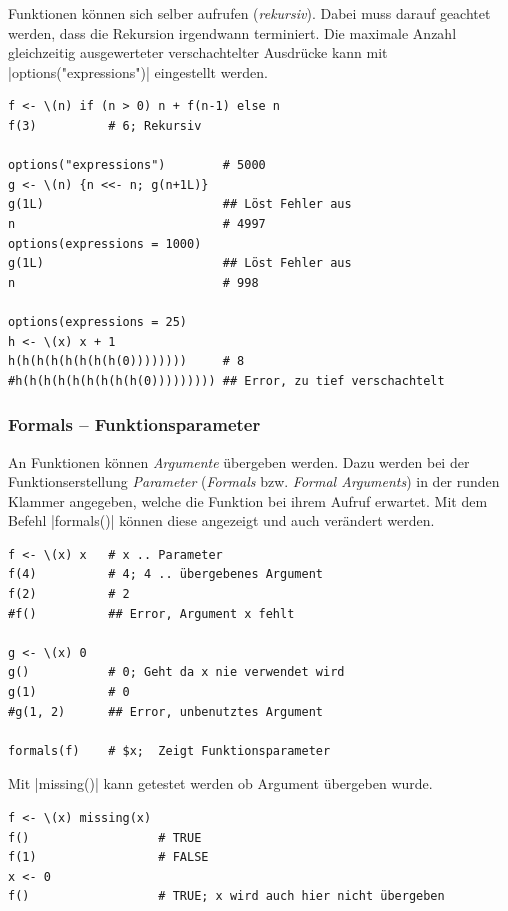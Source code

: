 \documentclass[10pt,twocolumn]{scrartcl}
\renewcommand{\lstinline}{\mycoloredinline}
\begin{document}
Funktionen können sich selber aufrufen (\emph{rekursiv}). Dabei muss darauf geachtet werden, dass die Rekursion irgendwann terminiert. Die maximale Anzahl gleichzeitig ausgewerteter verschachtelter Ausdrücke kann mit \lstinline|options("expressions")| eingestellt werden.

\begin{lstlisting}
f <- \(n) if (n > 0) n + f(n-1) else n
f(3)          # 6; Rekursiv

options("expressions")        # 5000
g <- \(n) {n <<- n; g(n+1L)}
g(1L)                         ## Löst Fehler aus
n                             # 4997
options(expressions = 1000)
g(1L)                         ## Löst Fehler aus
n                             # 998

options(expressions = 25)
h <- \(x) x + 1
h(h(h(h(h(h(h(h(0))))))))     # 8
#h(h(h(h(h(h(h(h(h(0))))))))) ## Error, zu tief verschachtelt
\end{lstlisting}

\subsubsection{Formals -- Funktionsparameter}

An Funktionen können \emph{Argumente} übergeben werden. Dazu werden bei der Funktionserstellung \emph{Parameter} (\emph{Formals} bzw. \emph{Formal Arguments}) in der runden Klammer angegeben, welche die Funktion bei ihrem Aufruf erwartet. Mit dem Befehl \lstinline|formals()| können diese angezeigt und auch verändert werden.

\begin{lstlisting}
f <- \(x) x   # x .. Parameter
f(4)          # 4; 4 .. übergebenes Argument
f(2)          # 2
#f()          ## Error, Argument x fehlt

g <- \(x) 0
g()           # 0; Geht da x nie verwendet wird
g(1)          # 0
#g(1, 2)      ## Error, unbenutztes Argument

formals(f)    # $x;  Zeigt Funktionsparameter
\end{lstlisting}

Mit \lstinline|missing()| kann getestet werden ob Argument übergeben wurde.

\begin{lstlisting}
f <- \(x) missing(x)
f()                  # TRUE
f(1)                 # FALSE
x <- 0
f()                  # TRUE; x wird auch hier nicht übergeben
\end{lstlisting}
\end{document}
